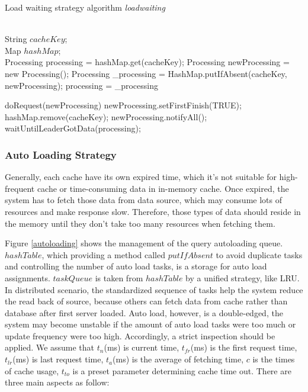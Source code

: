 \documentclass{singlecol-new}
\theoremstyle{TH}{
\newtheorem{lemma}{Lemma}
\newtheorem{theorem}[lemma]{Theorem}
\newtheorem{corrolary}[lemma]{Corrolary}
\newtheorem{conjecture}[lemma]{Conjecture}
\newtheorem{proposition}[lemma]{Proposition}
\newtheorem{claim}[lemma]{Claim}
\newtheorem{stheorem}[lemma]{Wrong Theorem}
}
\theoremstyle{THrm}{
\newtheorem{definition}{Definition}[section]
\newtheorem{question}{Question}[section]
\newtheorem{remark}{Remark}
\newtheorem{scheme}{Scheme}
}
\theoremstyle{THhit}{
\newtheorem{case}{Case}[section]
}
\begin{document}
\begin{algorithm}
\caption{Load waiting strategy algorithm \textit{loadwaiting}}
\label{loadwaitingalg}
\begin{algorithmic}[1]
\REQUIRE ~~\\
  String $cacheKey$;\\
  Map $hashMap$;
\ENSURE ~~\\

\STATE Processing processing = hashMap.get(cacheKey);
\STATE Processing newProcessing = new Processing();
\STATE Processing \_processing = HashMap.putIfAbsent(cacheKey, newProcessing);
\STATE processing = \_processing
\ENDIF
\ENDIF

\STATE doRequest(newProcessing)
\STATE newProcessing.setFirstFinish(TRUE);
\STATE hashMap.remove(cacheKey);
\STATE newProcessing.notifyAll();
\ELSE
\STATE waitUntilLeaderGotData(processing);
\ENDIF


\RETURN

\medskip

\end{algorithmic}
\end{algorithm}

\subsubsection{Auto Loading Strategy}
Generally, each cache have its own expired time, which it's not suitable for high-frequent cache or time-consuming data in in-memory cache. Once expired, the system has to fetch those data from data source, which may consume lots of resources and make response slow. Therefore, those types of data should reside in the memory until they don't take too many resources when fetching them.

Figure \ref{autoloading} shows the management of the query autoloading queue. $hashTable$, which providing a method called $putIfAbsent$ to avoid duplicate tasks and controlling the number of auto load tasks, is a storage for auto load assignments. $taskQueue$ is taken from $hashTable$ by a unified strategy, like LRU. In distributed scenario, the standardized sequence of tasks help the system reduce the read back of source, because others can fetch data from cache rather than database after first server loaded. Auto load, however, is a double-edged, the system may become unstable if the amount of auto load tasks were too much or update frequency were too high. Accordingly, a strict inspection should be applied. We assume that $t_n$(ms) is current time, $t_{fr}$(ms) is the first request time, $t_{lr}$(ms) is last request time,  $t_a$(ms) is the average of fetching time, $c$ is the times of cache usage, $t_{to}$ is a preset parameter determining cache time out. There are three main aspects as follow:
\end{document}
